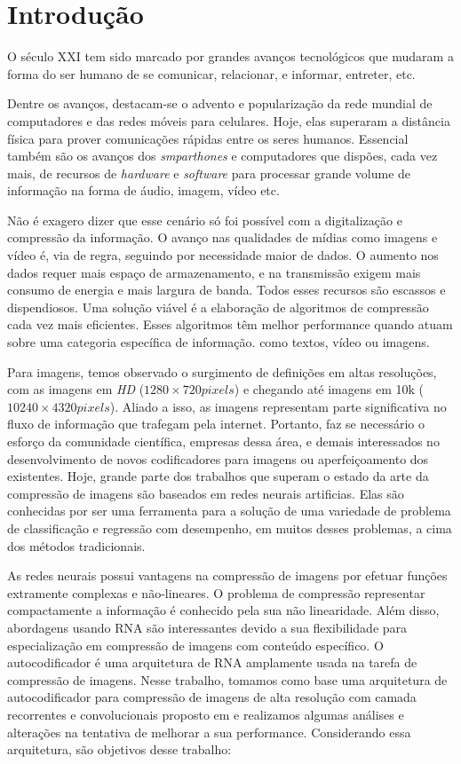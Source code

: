 \chapter{Introdução}

O século XXI tem sido marcado por grandes avanços tecnológicos que mudaram a forma do ser humano de se comunicar, relacionar, e informar, entreter, etc.

Dentre os avanços, destacam-se o advento e popularização da rede mundial de computadores e das redes móveis para celulares. Hoje, elas superaram a distância física para prover  comunicações rápidas entre os seres humanos. Essencial também são os avanços dos \textit{smparthones} e computadores que dispões, cada vez mais, de recursos de \textit{hardware} e \textit{software} para processar grande volume de informação na forma de áudio, imagem, vídeo etc.

Não é exagero dizer que esse cenário só foi possível com a digitalização e compressão da informação. O avanço nas qualidades de mídias como imagens e vídeo é, via de regra, seguindo por necessidade maior de dados. 
 O aumento nos dados requer mais espaço de armazenamento, e na transmissão exigem mais consumo de energia e mais largura de banda. Todos esses recursos são escassos e dispendiosos. Uma solução viável é a elaboração  de algoritmos de compressão cada vez mais eficientes. Esses algoritmos têm melhor performance quando atuam sobre uma categoria específica de informação. como textos, vídeo ou imagens.    

Para imagens, temos observado o surgimento de definições em altas resoluções, com as imagens em \textit{HD} ($1280 \times 720 pixels$) e chegando até imagens em 10k ($10240 \times 4320 pixels$). Aliado a isso, as imagens representam parte significativa no fluxo de informação que trafegam pela internet. 
Portanto, faz se necessário o esforço da comunidade científica, empresas dessa área, e demais interessados no desenvolvimento de novos codificadores para imagens ou aperfeiçoamento dos existentes. Hoje, grande parte dos trabalhos que superam o estado da arte da compressão de imagens são baseados em redes neurais artificias. Elas são conhecidas por ser uma ferramenta para a solução de uma variedade de problema de classificação e regressão com desempenho, em muitos desses problemas, a cima dos métodos tradicionais.

As redes neurais possui vantagens na compressão de imagens por efetuar funções extramente complexas e não-lineares. O problema de compressão  representar compactamente a informação é conhecido pela sua não linearidade.  Além disso, abordagens usando RNA são interessantes devido a sua flexibilidade para especialização em compressão de imagens com conteúdo específico.  O autocodificador é uma arquitetura de RNA  amplamente usada na tarefa de compressão de imagens. Nesse trabalho, tomamos como base uma arquitetura de autocodificador para compressão de imagens de alta resolução com camada recorrentes e convolucionais proposto em \cite{FullResolution2017Toderici} e realizamos algumas análises e alterações na tentativa de melhorar a sua performance. Considerando essa arquitetura, são objetivos desse trabalho:

